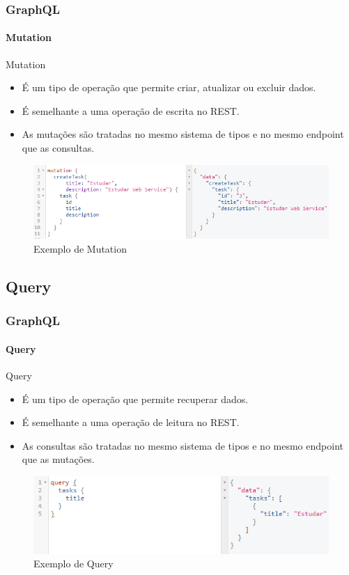 \documentclass[
	9pt, %
	t, %
]{beamer}
\newcommand{\yellowbox}[1]{\colorbox{yellow!75}{#1}}
\begin{document}
\begin{frame}
	\frametitle{GraphQL}
	\framesubtitle{Mutation}

	\begin{block}{Mutation}
		\begin{itemize}
			\item É um tipo de operação que permite \yellowbox{criar, atualizar ou excluir dados.}
			\item É semelhante a uma operação de escrita no REST.
			\item As mutações são tratadas no mesmo sistema de tipos e no mesmo endpoint que as consultas.
		\end{itemize}
	\end{block}

	\begin{figure}
		\includegraphics[width=0.9\linewidth]{gql_mutation.png}
		\caption{Exemplo de Mutation}
		\label{fig:graphql_mutation}
	\end{figure}

\end{frame}

\subsection{Query}

\begin{frame}
	\frametitle{GraphQL}
	\framesubtitle{Query}

	\begin{block}{Query}
		\begin{itemize}
			\item É um tipo de operação que permite \yellowbox{recuperar dados.}
			\item É semelhante a uma operação de leitura no REST.
			\item As consultas são tratadas no mesmo sistema de tipos e no mesmo endpoint que as mutações.
		\end{itemize}
	\end{block}

	\begin{figure}
		\includegraphics[width=0.9\linewidth]{gql_query.png}
		\caption{Exemplo de Query}
		\label{fig:graphql_query}
	\end{figure}

\end{frame}
\end{document}
